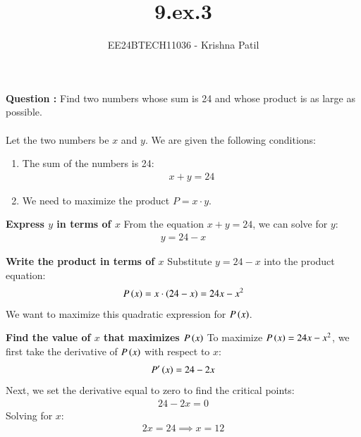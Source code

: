 \documentclass[journal]{IEEEtran}
\begin{document}

\vspace{3cm}

\title{9.ex.3}
\author{EE24BTECH11036 - Krishna Patil}
{\let\newpage\relax\maketitle}

\renewcommand{\thefigure}{\theenumi}
\renewcommand{\thetable}{\theenumi}
\setlength{\intextsep}{10pt} %

\renewcommand{\thefigure}{\theenumi}
\renewcommand{\thetable}{\theenumi}
\setlength{\intextsep}{10pt} %

\textbf{Question :}  Find two numbers whose sum is 24 and whose product is as large as possible. \\

\solution \\

Let the two numbers be $ x $ and $ y $. We are given the following conditions:

\begin{enumerate}
    \item The sum of the numbers is 24:
    \begin{align}
        x + y = 24
    \end{align}
    \item We need to maximize the product $ P = x \cdot y $.
\end{enumerate}

\textbf{Express $ y $ in terms of $ x $}  
From the equation $ x + y = 24 $, we can solve for $ y $:
\begin{align}
    y = 24 - x
\end{align}

\textbf{Write the product in terms of $ x $}  
Substitute $ y = 24 - x $ into the product equation:
\begin{align}
    P\left(x\right) = x \cdot \left(24 - x\right) = 24x - x^2
\end{align}
We want to maximize this quadratic expression for $ P\left(x\right) $.

\textbf{Find the value of $ x $ that maximizes $ P\left(x\right) $}  
To maximize $ P\left(x\right) = 24x - x^2 $, we first take the derivative of $ P\left(x\right) $ with respect to $ x $:
\begin{align}
    P{^\prime}\left(x\right) = 24 - 2x
\end{align}
Next, we set the derivative equal to zero to find the critical points:
\begin{align}
    24 - 2x = 0
\end{align}
Solving for $ x $:
\begin{align}
    2x = 24 \implies x = 12
\end{align}
\end{document}
